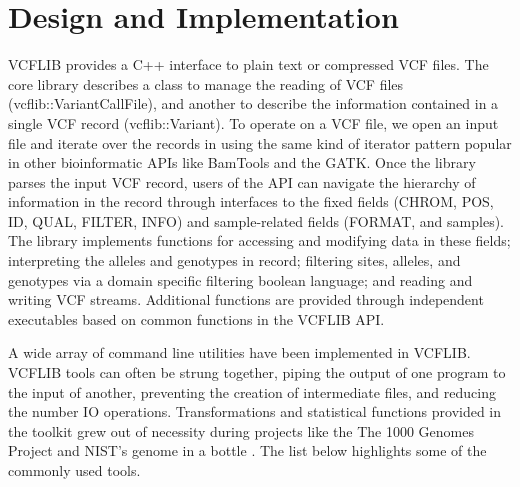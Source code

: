 \documentclass[10pt,letterpaper]{article}
\begin{document}

\section*{Design and Implementation}

VCFLIB provides a C++ interface to plain text or compressed VCF files. The core library describes a class to manage the reading of VCF files (vcflib::VariantCallFile), and another to describe the information contained in a single VCF record (vcflib::Variant). To operate on a VCF file, we open an input file and iterate over the records in using the same kind of iterator pattern popular in other bioinformatic APIs like BamTools \cite{bamtools} and the GATK\cite{mckenna,depristo}. Once the library parses the input VCF record, users of the API can navigate the hierarchy of information in the record through interfaces to the fixed fields (CHROM, POS, ID, QUAL, FILTER, INFO) and sample-related fields (FORMAT, and samples). The library implements functions for accessing and modifying data in these fields; interpreting the alleles and genotypes in record; filtering sites, alleles, and genotypes via a domain specific filtering boolean language; and reading and writing VCF streams. Additional functions are provided through independent executables based on common functions in the VCFLIB API.  

A wide array of command line utilities have been implemented in VCFLIB.  VCFLIB tools can often be strung together, piping the output of one program to the input of another, preventing the creation of intermediate files, and reducing the number IO operations.  Transformations and statistical functions provided in the toolkit grew out of necessity during projects like the The 1000 Genomes Project and NIST's genome in a bottle \cite{nist,1kg}.  The list below highlights some of the commonly used tools.
\end{document}
